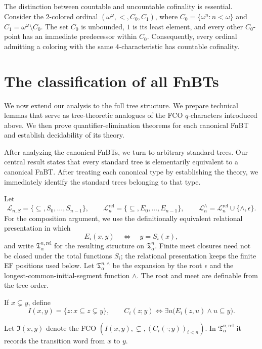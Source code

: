 \documentclass{amsart}
\theoremstyle{definition}
\begin{document}
The distinction between countable and uncountable cofinality is essential. Consider the $2$-colored ordinal $(\omega^\omega,<,C_0,C_1)$, where $C_0=\{\omega^n:n<\omega\}$ and $C_1=\omega^\omega\setminus C_0$. The set $C_0$ is unbounded, $1$ is its least element, and every other $C_0$-point has an immediate predecessor within $C_0$. Consequently, every ordinal admitting a coloring with the same $4$-characteristic has countable cofinality.

\section{The classification of all FnBTs}

We now extend our analysis to the full tree structure. We prepare technical lemmas that serve as tree-theoretic analogues of the FCO $q$-characters introduced above. We then prove quantifier-elimination theorems for each canonical FnBT and establish decidability of its theory.

After analyzing the canonical FnBTs, we turn to arbitrary standard trees. Our central result states that every standard tree is elementarily equivalent to a canonical FnBT. After treating each canonical type by establishing the theory, we immediately identify the standard trees belonging to that type.

Let
$$\mathcal L_{n,S}=\{\subseteq,S_0,\ldots,S_{n-1}\},\qquad\mathcal L_n^{\mathrm{rel}}=\{\subseteq,E_0,\ldots,E_{n-1}\},\qquad\mathcal L_n^\wedge=\mathcal L_n^{\mathrm{rel}}\cup\{\wedge,\epsilon\}.$$
For the composition argument, we use the definitionally equivalent relational
presentation in which
$$E_i(x,y)\quad\Longleftrightarrow\quad y=S_i(x),$$
and write $\mathfrak T_\alpha^{n,\mathrm{rel}}$ for the resulting structure on $\mathfrak{T}_\alpha^n$.
Finite meet closures need not be closed under the total functions $S_i$; the
relational presentation keeps the finite EF positions used below. Let
$\mathfrak T_\alpha^{n,\wedge}$ be the expansion by the root $\epsilon$ and the
longest-common-initial-segment function $\wedge$. The root and meet are
definable from the tree order.

\label{def:path-predicates}
If $x\subsetneq y$, define
$$I(x,y)=\{z:x\subseteq z\subsetneq y\},\qquad C_i(z;y)\Longleftrightarrow\exists u\bigl(E_i(z,u)\wedge u\subseteq y\bigr).$$

Let $\mathfrak I(x,y)$ denote the FCO $(I(x,y),\subsetneq,(C_i(\mathord\cdot;y))_{i<n})$. In $\mathfrak T^{n,\mathrm{rel}}_\alpha$ it records the transition word from $x$ to $y$.
\end{document}

